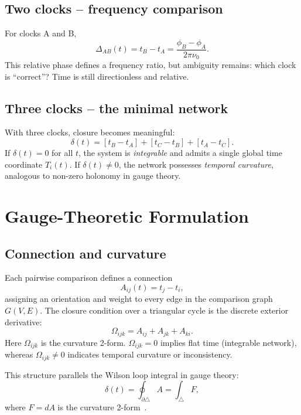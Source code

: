 \documentclass[11pt,a4paper]{article}
\begin{document}
\subsection{Two clocks – frequency comparison}
For clocks A and B,
\begin{equation}
\Delta_{AB}(t) = t_B - t_A = \frac{\phi_B - \phi_A}{2\pi\nu_0}.
\end{equation}
This relative phase defines a frequency ratio, but ambiguity remains: which clock is ``correct''? 
Time is still directionless and relative.

\subsection{Three clocks – the minimal network}
With three clocks, closure becomes meaningful:
\begin{equation}
\delta(t) = [t_B - t_A] + [t_C - t_B] + [t_A - t_C].
\end{equation}
If $\delta(t)=0$ for all $t$, the system is \emph{integrable} and admits a single global time coordinate $T_i(t)$. 
If $\delta(t)\neq 0$, the network possesses \emph{temporal curvature}, analogous to non-zero holonomy in gauge theory.

\section{Gauge-Theoretic Formulation}

\subsection{Connection and curvature}
Each pairwise comparison defines a connection
\begin{equation}
A_{ij}(t) = t_j - t_i,
\end{equation}
assigning an orientation and weight to every edge in the comparison graph $G(V,E)$. 
The closure condition over a triangular cycle is the discrete exterior derivative:
\begin{equation}
\Omega_{ijk} = A_{ij} + A_{jk} + A_{ki}.
\end{equation}
\noindent
Here $\Omega_{ijk}$ is the curvature 2-form. 
$\Omega_{ijk}=0$ implies flat time (integrable network), whereas $\Omega_{ijk}\neq0$ indicates temporal curvature or inconsistency.

This structure parallels the Wilson loop integral in gauge theory:
\begin{equation}
\delta(t) = \oint_{\partial \triangle} A = \int_{\triangle} F,
\end{equation}
where $F=dA$ is the curvature 2-form~\citep{Frankel2011,Singer2011,Tartaglia2013}.
\end{document}
